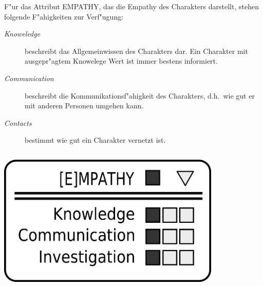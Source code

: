 \begin{column}[l]{0.55}
    F"ur das Attribut EMPATHY, das die Empathy des Charakters darstellt, stehen folgende F"ahigkeiten zur Verf"ugung:

    \begin{description}
        \item[\emph{Knoweledge}] beschreibt das Allgemeinwissen des Charakters dar. Ein Charakter mit ausgepr"agtem Knowelege Wert ist 
            immer bestens informiert.
        \item[\emph{Communication}] beschreibt die Kommunikationsf"ahigkeit des Charakters, d.h.~wie gut er mit anderen Personen umgehen 
            kann.
        \item[\emph{Contacts}] bestimmt wie gut ein Charakter vernetzt ist.
    \end{description}
\end{column}
\begin{column}[r]{0.45}
    \centering
    \includegraphics[width=0.80\textwidth]{images/character_empathy}
\end{column}

